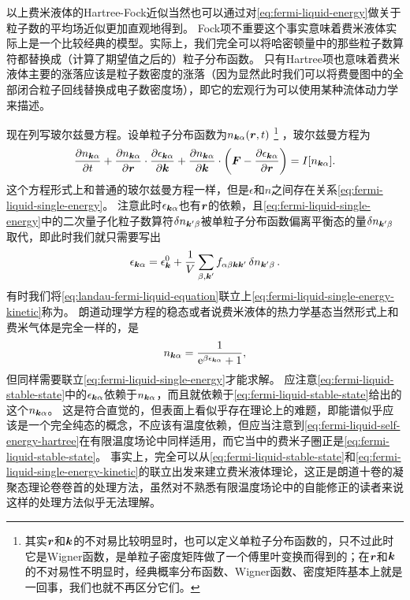 以上费米液体的Hartree-Fock近似当然也可以通过对\eqref{eq:fermi-liquid-energy}做关于粒子数的平均场近似更加直观地得到。
Fock项不重要这个事实意味着费米液体实际上是一个比较经典的模型。实际上，我们完全可以将哈密顿量中的那些粒子数算符都替换成（计算了期望值之后的）粒子分布函数。
只有Hartree项也意味着费米液体主要的涨落应该是粒子数密度的涨落（因为显然此时我们可以将费曼图中的全部闭合粒子回线替换成电子数密度场），即它的宏观行为可以使用某种流体动力学来描述。

现在列写玻尔兹曼方程。设单粒子分布函数为$n_{\vb*{k} \alpha}(\vb*{r}, t)$%
\footnote{
    其实$\vb*{r}$和$\vb*{k}$的不对易比较明显时，也可以定义单粒子分布函数的，只不过此时它是Wigner函数，是单粒子密度矩阵做了一个傅里叶变换而得到的；在$\vb*{r}$和$\vb*{k}$的不对易性不明显时，经典概率分布函数、Wigner函数、密度矩阵基本上就是一回事，我们也就不再区分它们。
}%
，玻尔兹曼方程为
\begin{equation}
    \pdv{n_{\vb*{k} \alpha}}{t} + \pdv{n_{\vb*{k} \alpha}}{\vb*{r}} \cdot \pdv{\epsilon_{\vb*{k} \alpha}}{\vb*{k}} + \pdv{n_{\vb*{k} \alpha}}{\vb*{k}} \cdot \left( \vb*{F} - \pdv{\epsilon_{\vb*{k} \alpha}}{\vb*{r}} \right) = I[n_{\vb*{k} \alpha}]. 
    \label{eq:landau-fermi-liquid-equation}
\end{equation}
这个方程形式上和普通的玻尔兹曼方程一样，但是$\epsilon$和$n$之间存在关系\eqref{eq:fermi-liquid-single-energy}。
注意此时$\epsilon_{\vb*{k} \alpha}$也有$\vb*{r}$的依赖，且\eqref{eq:fermi-liquid-single-energy}中的二次量子化粒子数算符$\var{n_{\vb*{k}' \beta}}$被单粒子分布函数偏离平衡态的量$\var{n_{\vb*{k}' \beta}}$取代，即此时我们就只需要写出
\begin{equation}
    \epsilon_{\vb*{k} \alpha} = \epsilon_{\vb*{k}}^0 + \frac{1}{V} \sum_{\beta, \vb*{k}'} f_{\alpha \beta \vb*{k} \vb*{k}'} \var{n_{\vb*{k}' \beta}}.
    \label{eq:fermi-liquid-single-energy-kinetic}
\end{equation}
有时我们将\eqref{eq:landau-fermi-liquid-equation}联立上\eqref{eq:fermi-liquid-single-energy-kinetic}称为。
朗道动理学方程的稳态或者说费米液体的热力学基态当然形式上和费米气体是完全一样的，是
\begin{equation}
    n_{\vb*{k} \alpha} = \frac{1}{\mathrm{e}^{\beta \epsilon_{\vb*{k} \alpha}} + 1},
    \label{eq:fermi-liquid-stable-state}
\end{equation}
但同样需要联立\eqref{eq:fermi-liquid-single-energy}才能求解。
应注意\eqref{eq:fermi-liquid-stable-state}中的$\epsilon_{\vb*{k} \alpha}$依赖于$n_{\vb*{k} \alpha}$，而且就依赖于\eqref{eq:fermi-liquid-stable-state}给出的这个$n_{\vb*{k} \alpha}$。
这是符合直觉的，但表面上看似乎存在理论上的难题，即能谱似乎应该是一个完全纯态的概念，不应该有温度依赖，但应当注意到\eqref{eq:fermi-liquid-self-energy-hartree}在有限温度场论中同样适用，而它当中的费米子圈正是\eqref{eq:fermi-liquid-stable-state}。
事实上，完全可以从\eqref{eq:fermi-liquid-stable-state}和\eqref{eq:fermi-liquid-single-energy-kinetic}的联立出发来建立费米液体理论，这正是朗道十卷的凝聚态理论卷卷首的处理方法，虽然对不熟悉有限温度场论中的自能修正的读者来说这样的处理方法似乎无法理解。

